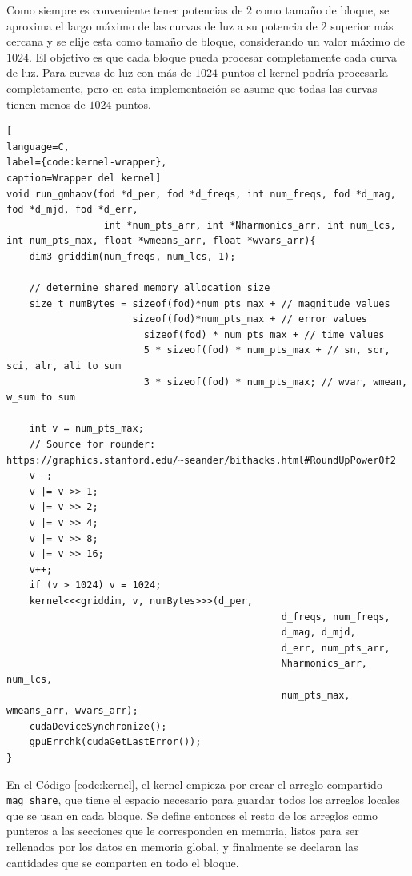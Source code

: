 Como siempre es conveniente tener potencias de $2$ como tamaño de bloque, se aproxima el largo máximo de las curvas de luz a su potencia de $2$ superior más cercana y se elije esta como tamaño de bloque, considerando un valor máximo de $1024$. El objetivo es que cada bloque pueda procesar completamente cada curva de luz. Para curvas de luz con más de $1024$ puntos el kernel podría procesarla completamente, pero en esta implementación se asume que todas las curvas tienen menos de $1024$ puntos.
\begin{lstlisting}[
language=C,
label={code:kernel-wrapper},
caption=Wrapper del kernel]
void run_gmhaov(fod *d_per, fod *d_freqs, int num_freqs, fod *d_mag, fod *d_mjd, fod *d_err,
                 int *num_pts_arr, int *Nharmonics_arr, int num_lcs, int num_pts_max, float *wmeans_arr, float *wvars_arr){
    dim3 griddim(num_freqs, num_lcs, 1); 

    // determine shared memory allocation size
    size_t numBytes = sizeof(fod)*num_pts_max + // magnitude values
                      sizeof(fod)*num_pts_max + // error values
                        sizeof(fod) * num_pts_max + // time values
                        5 * sizeof(fod) * num_pts_max + // sn, scr, sci, alr, ali to sum
                        3 * sizeof(fod) * num_pts_max; // wvar, wmean, w_sum to sum

    int v = num_pts_max;
    // Source for rounder: https://graphics.stanford.edu/~seander/bithacks.html#RoundUpPowerOf2
    v--;
    v |= v >> 1;
    v |= v >> 2;
    v |= v >> 4;
    v |= v >> 8;
    v |= v >> 16;
    v++;
    if (v > 1024) v = 1024;
    kernel<<<griddim, v, numBytes>>>(d_per,
                                                d_freqs, num_freqs,
                                                d_mag, d_mjd,
                                                d_err, num_pts_arr,
                                                Nharmonics_arr, num_lcs,
                                                num_pts_max, wmeans_arr, wvars_arr);
    cudaDeviceSynchronize();
    gpuErrchk(cudaGetLastError());
}
\end{lstlisting}

En el Código \ref{code:kernel}, el kernel empieza por crear el arreglo compartido \texttt{mag\_share}, que tiene el espacio necesario para guardar todos los arreglos locales que se usan en cada bloque. Se define entonces el resto de los arreglos como punteros a las secciones que le corresponden en memoria, listos para ser rellenados por los datos en memoria global, y finalmente se declaran las cantidades que se comparten en todo el bloque.

